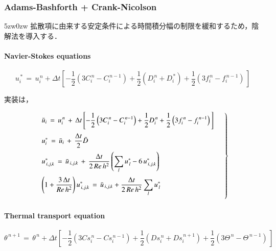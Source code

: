 \subsubsection{Adams-Bashforth + Crank-Nicolson}
\begin{indentation}{5zw}{0zw}
拡散項に由来する安定条件による時間積分幅の制限を緩和するため，陰解法を導入する．

\paragraph{Navier-Stokes equations}
\begin{equation}
u_i^{\,*} \,=\, u_i^{\,n} + \Delta t \left[ - \frac{1}{2} \left(  3 C_i^{\,n} - C_i^{\,n-1} \right)
               + \frac{1}{2} \left( D_i^{\,n} + D_i^{\,*}  \right) + \frac{1}{2} \left( 3f_i^{\,n} - f_i^{\,n-1} \right) \, \right]
\label{eq:pseudo vector ABCN}
\end{equation}

\noindent 実装は，

\begin{equation}
\left.
\begin{array}{l}
\vspace{2mm}
\displaystyle{ \bar{u}_i \,=\, u_i^{\,n} \,+\, \Delta t \left[ - \frac{1}{2} \left(  3 C_i^{\,n} - C_i^{\,n-1} \right)
+ \frac{1}{2} D_i^{\,n} + \frac{1}{2} \left( 3f_i^{\,n} - f_i^{\,n-1} \right) \, \right] } \\
\vspace{2mm}
\displaystyle{ u_i^* \,=\, \bar{u}_i \,+\, \frac{\Delta t}{2} \bar{D} }\\
\vspace{2mm}
\displaystyle{ u_{\,i,j,k}^* \,=\, \bar{u}_{\,i,j,k} \,+\, \frac{\Delta t}{2\,Re\,h^2} \left( \sum \limits_l {u_{\,l}^*} - 6\,u_{\,i,j,k}^* \right) } \\
\vspace{2mm}
\displaystyle{ \left( 1 + \frac{3\,\Delta t}{Re\,h^2} \right) u_{\,i,j,k}^* \,=\, \bar{u}_{\,i,j,k} + \frac{\Delta t}{2\,Re\,h^2} \sum \limits_l {u_{\,l}^*} } \\
\end{array} \quad \right\}
\label{eq:CN iteration ABCN}
\end{equation}

\paragraph{Thermal transport equation}
\begin{equation}
\theta^{\,n+1} \,=\, \theta^{\,n} + \Delta t \left[ - \frac{1}{2} \left( 3 Cs_i^{\,n} - Cs_i^{\,n-1} \right) + 
\frac{1}{2} \left( Ds_i^{\,n} + Ds_i^{\,n+1}\right) + \frac{1}{2} \left( 3\Theta^{\,n} -\Theta^{\,n-1} \right) \, \right]
\label{eq:thermal transport ABCN}
\end{equation}


\end{indentation}
